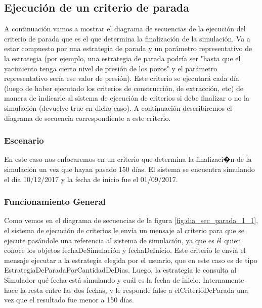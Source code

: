 \subsection{Ejecución de un criterio de parada}

\par A continuación vamos a mostrar el diagrama de secuencias de la ejecución del criterio de parada que es el que determina la finalización de la simulación. Va a estar compuesto por una estrategia de parada y un parámetro representativo de la estrategia (por ejemplo, una estrategia de parada podría ser "hasta que el yacimiento tenga cierto nivel de presión de los pozos" y el parámetro representativo sería ese valor de presión). Este criterio se ejecutará cada día (luego de haber ejecutado los criterios de construcción, de extracción, etc) de manera de indicarle al sistema de ejecución de criterios si debe finalizar o no la simulación (devuelve true en dicho caso). A continuación describiremos el diagrama de secuencia correspondiente a este criterio.


\subsubsection{Escenario}
\par En este caso nos enfocaremos en un criterio que determina la finalizaci�n de la simulación un vez que hayan pasado 150 días. El sistema se encuentra simulando el día 10/12/2017 y la fecha de inicio fue el 01/09/2017.

\subsubsection{Funcionamiento General}
\par Como vemos en el diagrama de secuencias de la figura \ref{fig:dia_sec_parada_1_1}, el sistema de ejecución de criterios le envía un mensaje al criterio para que se ejecute pasándole una referencia al sistema de simulación, ya que es él quien conoce los objetos fechaDeSimulación y fechaDeInicio. Este criterio le envía el mensaje ejecutar a la estrategia elegida por el usuario, que en este caso es de tipo EstrategiaDeParadaPorCantidadDeDias. Luego, la estrategia le consulta al Simulador qué fecha está simulando y cuál es la fecha de inicio. Internamente hace la resta entre las dos fechas, y le responde false a elCriterioDeParada una vez que el resultado fue menor a 150 días.

